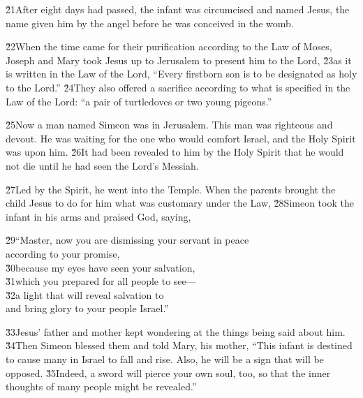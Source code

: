 \v{21}After eight days had passed, the infant was circumcised and named Jesus, the name given him by the angel before he was conceived in the womb.

\v{22}When the time came for their purification according to the Law of Moses, Joseph and Mary took Jesus up to Jerusalem to present him to the Lord, \v{23}as it is written in the Law of the Lord, ``Every firstborn son is to be designated as holy to the Lord.'' \v{24}They also offered a sacrifice according to what is specified in the Law of the Lord: ``a pair of turtledoves or two young pigeons.''

\v{25}Now a man named Simeon was in Jerusalem. This man was righteous and devout. He was waiting for the one who would comfort Israel, and the Holy Spirit was upon him. \v{26}It had been revealed to him by the Holy Spirit that he would not die until he had seen the Lord's Messiah.

\v{27}Led by the Spirit, he went into the Temple. When the parents brought the child Jesus to do for him what was customary under the Law, \v{28}Simeon took the infant in his arms and praised God, saying,

\begin{poetry}
\poeml \v{29}``Master, now you are dismissing your servant in peace \\
\poemll    according to your promise, \\
\poeml \v{30}because my eyes have seen your salvation, \\
\poeml \v{31}which you prepared for all people to see--- \\
\poeml \v{32}a light that will reveal salvation to  \\
\poemll    and bring glory to your people Israel.''
\end{poetry}

\v{33}Jesus' father and mother kept wondering at the things being said about him. \v{34}Then Simeon blessed them and told Mary, his mother, ``This infant is destined to cause many in Israel to fall and rise. Also, he will be a sign that will be opposed. \v{35}Indeed, a sword will pierce your own soul, too, so that the inner thoughts of many people might be revealed.''

